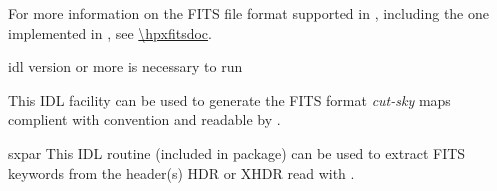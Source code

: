 \begin{codedescription}
{For more information on the FITS file format supported in \healpixns, 
including the one implemented in \facname,
see \url{\hpxfitsdoc}.}

\end{codedescription}



\begin{related}
  \begin{sulist}{} %
  \item[idl] version \idlversion or more is necessary to run \facname
  \item[\htmlref{write\_fits\_cut4}{idl:write_fits_cut4}] This \healpix IDL
facility can be used to generate the FITS format {\em cut-sky} maps complient
with \healpix convention and readable by \facname.

    \item[sxpar] This IDL routine (included in \healpix package) can be
  used to extract FITS keywords from the header(s) HDR or XHDR read with \facname.
  \end{sulist}
\end{related}




